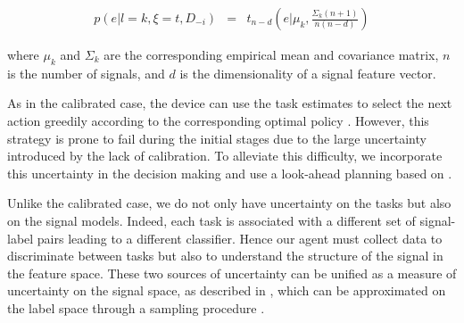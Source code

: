 \begin{eqnarray}
p(e| l=k,\xi=t, D_{-i}) & = & t_{n-d}\left(e | \mu_k,\frac{\Sigma_k (n+1)}{n(n-d)}\right)
\end{eqnarray}

where $\mu_k$ and $\Sigma_k$ are the corresponding empirical mean and covariance matrix, $n$ is the number of signals, and $d$ is the dimensionality of a signal feature vector.
%

As in the calibrated case, the device can use the task estimates to select the next action greedily according to the corresponding optimal policy \cite{iturrate13}. However, this strategy is prone to fail during the initial stages due to the large uncertainty introduced by the lack of calibration. To alleviate this difficulty, we incorporate this uncertainty in the decision making and use a look-ahead planning based on \cite{grizou2014interactive}.

Unlike the calibrated case, we do not only have uncertainty on the tasks but also on the signal models. Indeed, each task is associated with a different set of signal-label pairs leading to a different classifier. Hence our agent must collect data to discriminate between tasks but also to understand the structure of the signal in the feature space. These two sources of uncertainty can be unified as a measure of uncertainty on the signal space, as described in \cite{grizou2014calibration}, which can be approximated on the label space through a sampling procedure \cite{grizou2014interactive}.



